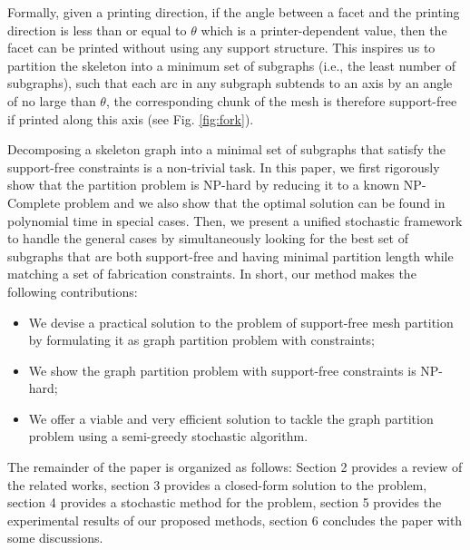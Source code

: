 Formally, given a printing direction, if the angle between a facet and the printing direction is less than or equal to $\theta$ which is a printer-dependent value, then the facet can be printed without using any support structure. This inspires us to partition the skeleton into a minimum set of subgraphs (i.e., the least number of subgraphs), such that each arc in any subgraph subtends to an axis by an angle of no large than $\theta$, the corresponding chunk of the mesh is therefore support-free if printed along this axis (see Fig. \ref{fig:fork}). %


{Decomposing a skeleton graph into a minimal set of subgraphs that satisfy the support-free constraints is a non-trivial task. In this paper, we first rigorously show that the partition problem is NP-hard by reducing it to a known NP-Complete problem and we also show that the optimal solution can be found in polynomial time in {special} cases. Then, we present a unified stochastic framework to handle the general cases by simultaneously looking for} the best set of subgraphs that are both support-free and having minimal partition length while matching a set of fabrication constraints. In short, our method makes the following contributions:

{
\begin{itemize}
\item {We devise a practical solution to the problem of support-free mesh partition by formulating it as graph partition problem with constraints;}
\item {We show the graph partition problem with support-free constraints is NP-hard;}
\item {We offer a viable and very efficient solution to tackle the graph partition problem using a semi-greedy stochastic algorithm.}
\end{itemize}
}
{The remainder of the paper is organized as follows: Section 2 provides a review of the related works, section 3 provides a closed-form solution to the problem, section 4 provides a stochastic method for the problem, section 5 provides the experimental results of our proposed methods, section 6 concludes the paper with some discussions.}
